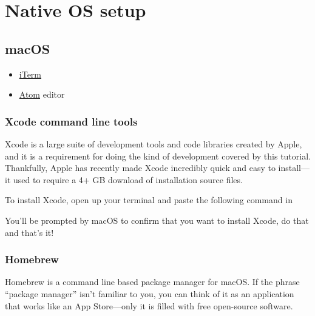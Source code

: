 

\section{Native OS setup} %
\label{sec:native_os_setup}

\subsection{macOS} %
\label{sec:macos}

\begin{itemize}
  \item \href{https://www.iterm2.com/downloads.html}{iTerm}
  \item \href{https://atom.io/}{Atom} editor
\end{itemize}


\subsubsection{Xcode command line tools}

\label{sec:shiny_xcode}

Xcode is a large suite of development tools and code libraries created by Apple, and it is a requirement for doing the kind of development covered by this tutorial. Thankfully, Apple has recently made Xcode incredibly quick and easy to install---it used to require a 4+ GB download of installation source files.

To install Xcode, open up your terminal and paste the following command in

\begin{codelisting}
\label{code:xcode-install}
\end{codelisting}

You'll be prompted by macOS to confirm that you want to install Xcode, do that and that's it!


\subsubsection{Homebrew}
\label{sec:homebrew}

Homebrew is a command line based package manager for macOS\@. If the phrase ``package manager'' isn't familiar to you, you can think of it as an application that works like an App Store---only it is filled with free open-source software.

